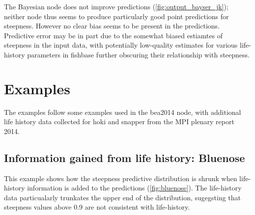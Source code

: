 \documentclass{dragonfly-report}
\begin{document}
The Bayesian node does not improve predictions (\autoref{fig:output_bayser_jk}); neither node thus seems to produce particularly good point predictions for steepness. However no clear bias seems to be present in the predictions. Predictive error may be in part due to the somewhat biased estiamtes of steepness in the input data, with potentially low-quality estimates for various life-history parameters in fishbase further obscuring their relationship with steepness.

\section{Examples}

The examples follow some examples used in the bea2014 node, with additional life history data collected for hoki and snapper from the MPI plenary report 2014.

\subsection{Information gained from life history: Bluenose}

This example shows how the steepness predictive distribution is shrunk when life-history information is added to the predictions (\autoref{fig:bluenose}). The life-history data particualarly trunkates the upper end of the distribution, sugegsting that steepness values above 0.9 are not consistent with life-history.
\end{document}
